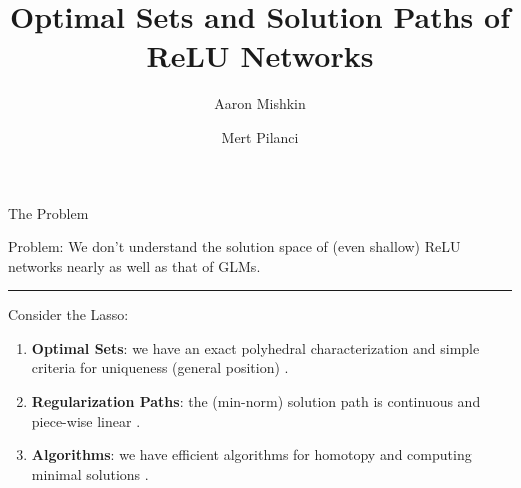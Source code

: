 \documentclass[usenames,dvipsnames,mathserif,notheorems]{beamer}
\title{Optimal Sets and Solution Paths of ReLU Networks}
\author{Aaron Mishkin \and Mert Pilanci}
\institute{ICML 2023}
\date{}
\newcommand{\horizontalrule}{
	{
			\vspace{-0.5em}
			\center \rule{\textwidth}{0.1em}
			\vspace{-0.2em}
		}
}
\newcommand{\bad}[1]{\textcolor{bad}{#1}}
\newcommand{\good}[1]{\textcolor{good}{#1}}
\begin{document}
\maketitle

\begin{frame}{The Problem}

	{
		\large \bad{Problem}: We don't understand the solution space of
		(even shallow) ReLU networks nearly as well as that of \good{GLMs}.
	}

	\pause
	\vspace{0.5em}
	\horizontalrule
	\vspace{0.5em}

	{
		\large
		Consider the Lasso:
	}

	\pause
	\vspace{0.5em}

	\begin{enumerate}
		\item \textbf{Optimal Sets}: we have an exact \good{polyhedral characterization} and simple criteria for \good{uniqueness} (general position) \citep{tibshirani2013unique}.\pause

		\item \textbf{Regularization Paths}: the (min-norm) solution path is \good{continuous} and \good{piece-wise linear} \citep{osborne2000new}.

		\item \textbf{Algorithms}: we have efficient algorithms for \good{homotopy} \citep{efron2004least} and computing \good{minimal solutions} \citep{tibshirani2013unique}.
	\end{enumerate}

\end{frame}
\end{document}
